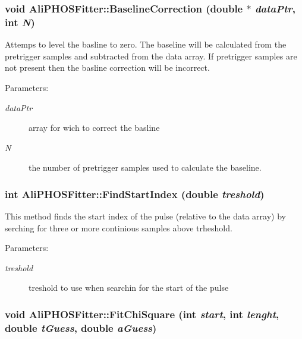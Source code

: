 \subsubsection{\setlength{\rightskip}{0pt plus 5cm}void Ali\-PHOSFitter::Baseline\-Correction (double $\ast$ {\em data\-Ptr}, int {\em N})}\label{classAliPHOSFitter_a3}


Attemps to level the basline to zero. The baseline will be calculated from the pretrigger samples and subtracted from the data array. If pretrigger samples are not present then the basline correction will be incorrect. \begin{Desc}
\item[Parameters:]
\begin{description}
\item[{\em data\-Ptr}]array for wich to correct the basline \item[{\em N}]the number of pretrigger samples used to calculate the baseline. \end{description}
\end{Desc}
\subsubsection{\setlength{\rightskip}{0pt plus 5cm}int Ali\-PHOSFitter::Find\-Start\-Index (double {\em treshold})}\label{classAliPHOSFitter_a11}


This method finds the start index of the pulse (relative to the data array) by serching for three or more continious samples above trheshold. \begin{Desc}
\item[Parameters:]
\begin{description}
\item[{\em treshold}]treshold to use when searchin for the start of the pulse \end{description}
\end{Desc}
\subsubsection{\setlength{\rightskip}{0pt plus 5cm}void Ali\-PHOSFitter::Fit\-Chi\-Square (int {\em start}, int {\em lenght}, double {\em t\-Guess}, double {\em a\-Guess})}\label{classAliPHOSFitter_a6}


